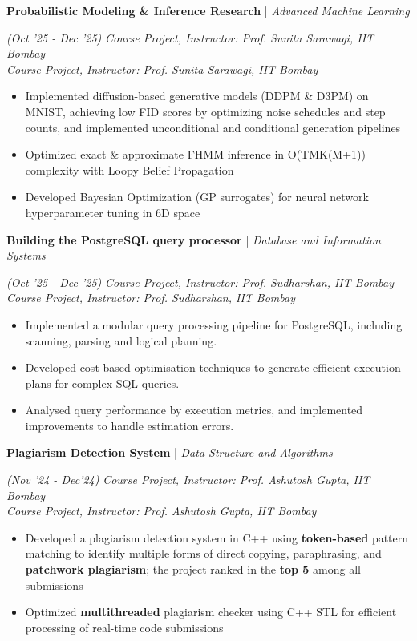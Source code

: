 \documentclass[10pt]{article}
\renewcommand{\subsection}[4]{
	\def\temp{#4}
	\vspace{2pt}
	{
		\large
		{\color{Green} \textbf{#1}} | {\sl #2} \filldate{#3}
		\ifx\temp\empty
		\else
		{
			\\[0.098em]
			\fontsize{10.5}{13.2}\selectfont
			\sl #4
		}
		\fi
	}
}
\newcommand{\filldate}[1]{\strut\hfill {\small \textit{(#1)}}}
\begin{document}
\subsection{Probabilistic Modeling \& Inference Research}{Advanced Machine Learning}{Oct '25 - Dec '25}{\textit{Course Project, Instructor: Prof. Sunita Sarawagi, IIT Bombay}}
\begin{itemize}
\item Implemented diffusion-based generative models (DDPM \& D3PM) on MNIST, achieving low FID scores by optimizing noise schedules and step counts, and implemented unconditional and conditional generation pipelines
\item Optimized exact \& approximate FHMM inference in O(TMK(M+1)) complexity with Loopy Belief Propagation
\item Developed Bayesian Optimization (GP surrogates) for neural network hyperparameter tuning in 6D space
\end{itemize}

\subsection{Building the PostgreSQL query processor}{Database and Information Systems}{Oct '25 - Dec '25}{\textit{Course Project, Instructor: Prof. Sudharshan, IIT Bombay}}
\begin{itemize}
    \item Implemented a modular query processing pipeline for PostgreSQL, including scanning, parsing and logical planning.
    \item Developed cost-based optimisation techniques to generate efficient execution plans for complex SQL queries.
    \item Analysed query performance by execution metrics, and implemented improvements to handle estimation errors.
\end{itemize}
\subsection{Plagiarism Detection System}{Data Structure and Algorithms}{Nov '24 - Dec'24}{\textit{Course Project, Instructor: Prof. Ashutosh Gupta, IIT Bombay}}
\begin{itemize}
    \item Developed a plagiarism detection system in C++ using \textbf{token-based} pattern matching to identify multiple forms of direct copying, paraphrasing, and \textbf{patchwork plagiarism}; the project ranked in the \textbf{top 5} among all submissions
    \item Optimized \textbf{multithreaded} plagiarism checker using C++ STL for efficient processing of real-time code submissions
\end{itemize}
\end{document}
